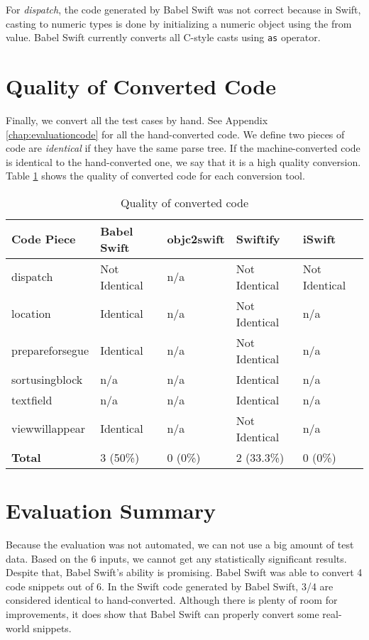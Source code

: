 \documentclass{sfuthesis}
\begin{document}
For \emph{dispatch}, the code generated by Babel Swift was not correct because in Swift, casting to numeric types is done by initializing a numeric object using the from value. Babel Swift currently converts all C-style casts using \texttt{as} operator.

\section{Quality of Converted Code}

Finally, we convert all the test cases by hand. See Appendix \ref{chap:evaluationcode} for all the hand-converted code. We define two pieces of code are \emph{identical} if they have the same parse tree. If the machine-converted code is identical to the hand-converted one, we say that it is a high quality conversion. Table \ref{table:quality} shows the quality of converted code for each conversion tool.

\begin{table}[H]
\begin{center}
\caption{Quality of converted code}
\label{table:quality}
\begin{tabular}{|l|l|l|l|l|}
\hline
\textbf{Code Piece} & Babel Swift & objc2swift & Swiftify & iSwift \\
\hline
dispatch        & Not Identical & n/a & Not Identical & Not Identical  \\
location        & Identical     & n/a & Not Identical & n/a            \\
prepareforsegue & Identical     & n/a & Not Identical & n/a            \\
sortusingblock  & n/a           & n/a & Identical     & n/a            \\
textfield       & n/a           & n/a & Identical     & n/a            \\
viewwillappear  & Identical     & n/a & Not Identical & n/a            \\
\hline
\textbf{Total}  & 3 (50\%) & 0 (0\%) & 2 (33.3\%) & 0 (0\%) \\
\hline
\end{tabular}
\end{center}
\end{table}

\section{Evaluation Summary}

Because the evaluation was not automated, we can not use a big amount of test data. Based on the 6 inputs, we cannot get any statistically significant results. Despite that, Babel Swift's ability is promising. Babel Swift was able to convert 4 code snippets out of 6. In the Swift code generated by Babel Swift, 3/4 are considered identical to hand-converted. Although there is plenty of room for improvements, it does show that Babel Swift can properly convert some real-world snippets.
\end{document}
